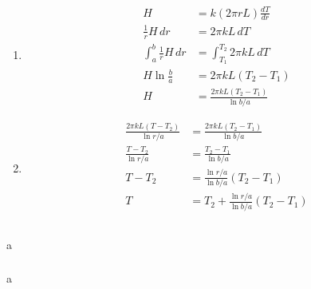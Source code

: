 \documentclass{article}
\begin{document}
\begin{enumerate}
  \item

        \begin{align*}
          H                           & = k (2 \pi r L) \frac{d T}{d r}           \\
          \frac{1}{r} H \,dr          & = 2 \pi k L \,d T                         \\
          \int_a^b \frac{1}{r} H \,dr & = \int_{T_1}^{T_2} 2 \pi k L \,d T        \\
          H \ln \frac{b}{a}           & = 2 \pi k L (T_2 - T_1)                   \\
          H                           & = \frac{2 \pi k L (T_2 - T_1)}{\ln b / a}
        \end{align*}

  \item

        \begin{align*}
          \frac{2 \pi k L (T - T_2)}{\ln r / a} & = \frac{2 \pi k L (T_2 - T_1)}{\ln b / a}       \\
          \frac{T - T_2}{\ln r / a}             & = \frac{T_2 - T_1}{\ln b / a}                   \\
          T - T_2                               & = \frac{\ln r / a}{\ln b / a} (T_2 - T_1)       \\
          T                                     & = T_2 + \frac{\ln r / a}{\ln b / a} (T_2 - T_1) \\
        \end{align*}
\end{enumerate}

\setcounter{subsubsection}{116}
\subsubsection{}

a

\setcounter{subsubsection}{118}
\subsubsection{}

a
\end{document}
